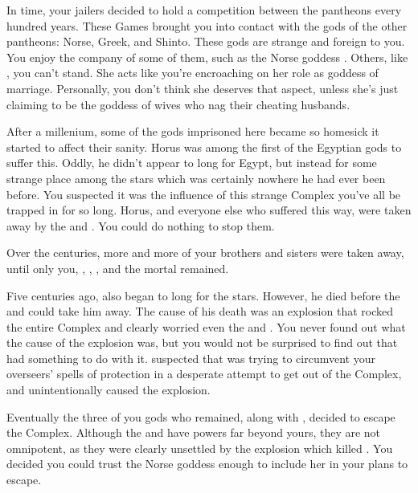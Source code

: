 \documentclass[char]{guardians}
\begin{document}

In time, your jailers decided to hold a competition between the pantheons every hundred years. These Games brought you into contact with the gods of the other pantheons: Norse, Greek, and Shinto. These gods are strange and foreign to you. You enjoy the company of some of them, such as the Norse goddess \cHel{}. Others, like \cHera{}, you can't stand. She acts like you're encroaching on her role as goddess of marriage. Personally, you don't think she deserves that aspect, unless she's just claiming to be the goddess of wives who nag their cheating husbands.

After a millenium, some of the gods imprisoned here became so homesick it started to affect their sanity. Horus was among the first of the Egyptian gods to suffer this. Oddly, he didn't appear to long for Egypt, but instead for some strange place among the stars which was certainly nowhere he had ever been before. You suspected it was the influence of this strange Complex you've all be trapped in for so long. Horus, and everyone else who suffered this way, were taken away by the \cCaretaker{} and \cWarden{}. You could do nothing to stop them.

Over the centuries, more and more of your brothers and sisters were taken away, until only you, \cOsiris{}, \cAnubis{}, \cSet{}, and the mortal \cEgyptianHuman{} remained.

Five centuries ago, \cSet{} also began to long for the stars. However, he died before the \cWarden{} and \cCaretaker{} could take him away. The cause of his death was an explosion that rocked the entire Complex and clearly worried even the \cWarden{} and \cCaretaker{}. You never found out what the cause of the explosion was, but you would not be surprised to find out that \cOsiris{} had something to do with it. \cAnubis{} suspected that \cSet{} was trying to circumvent your overseers' spells of protection in a desperate attempt to get out of the Complex, and unintentionally caused the explosion.

Eventually the three of you gods who remained, along with \cEgyptianHuman{}, decided to escape the Complex. Although the \cWarden{} and \cCaretaker{} have powers far beyond yours, they are not omnipotent, as they were clearly unsettled by the explosion which killed \cSet{}. You decided you could trust the Norse goddess \cHel{} enough to include her in your plans to escape.
\end{document}
